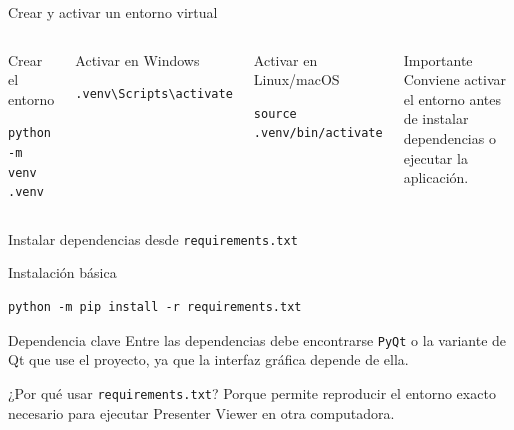 \documentclass[aspectratio=169,professionalfonts]{beamer}
\begin{document}
\begin{frame}[fragile]{Crear y activar un entorno virtual}
\begin{columns}[T,totalwidth=\textwidth]
\begin{block}{Crear el entorno}
\begin{lstlisting}
python -m venv .venv
\end{lstlisting}
\end{block}

\begin{block}{Activar en Windows}
\begin{lstlisting}
.venv\Scripts\activate
\end{lstlisting}
\end{block}

\begin{block}{Activar en Linux/macOS}
\begin{lstlisting}
source .venv/bin/activate
\end{lstlisting}
\end{block}

\begin{alertblock}{Importante}
Conviene activar el entorno antes de instalar dependencias o ejecutar la aplicación.
\end{alertblock}
\end{columns}

\end{frame}

\begin{frame}[fragile]{Instalar dependencias desde \texttt{requirements.txt}}
\begin{block}{Instalación básica}
\begin{lstlisting}
python -m pip install -r requirements.txt
\end{lstlisting}
\end{block}

\begin{block}{Dependencia clave}
Entre las dependencias debe encontrarse \texttt{PyQt} o la variante de Qt que use el proyecto, ya que la interfaz gráfica depende de ella.
\end{block}

\begin{exampleblock}{¿Por qué usar \texttt{requirements.txt}?}
Porque permite reproducir el entorno exacto necesario para ejecutar Presenter Viewer en otra computadora.
\end{exampleblock}

\end{frame}
\end{document}
